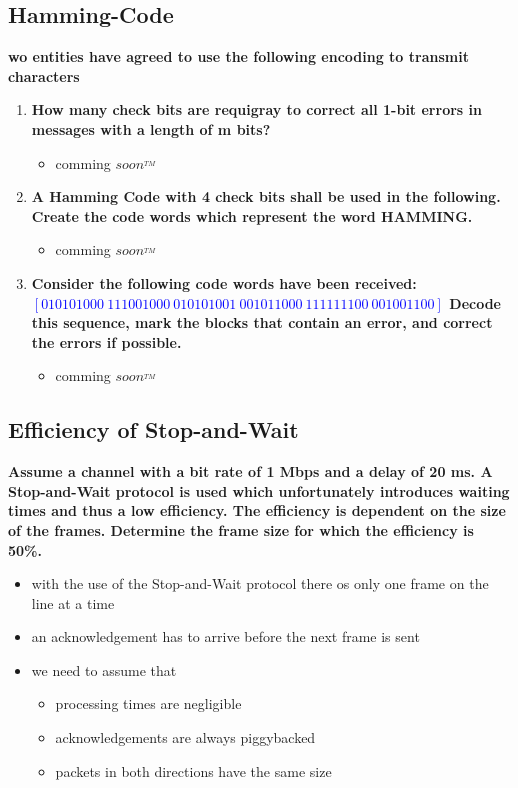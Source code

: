 \documentclass[a4paper,12pt]{article}
\begin{document}
	\subsection{Hamming-Code}
	\textbf{wo entities have agreed to use the following encoding to transmit characters}
	\begin{enumerate}[itemsep=0pt]
		\item \textbf{How many check bits are requigray to correct all 1-bit errors in messages with a length of m bits?}
		\begin{itemize}[itemsep=0pt]
			\item comming $soon^{_{TM}}$
		\end{itemize}
		\item \textbf{A Hamming Code with 4 check bits shall be used in the following.  Create the code words which represent the word HAMMING.}
		\begin{itemize}[itemsep=0pt]
			\item comming $soon^{_{TM}}$
		\end{itemize}
		\item \textbf{Consider the following code words have been received:	\\
		\textcolor{blue}{$[010101000~ 111001000~ 010101001~ 001011000~ 111111100~ 001001100]$} 
		Decode  this  sequence,  mark  the  blocks  that  contain  an  error,  and  correct  the  errors  if possible.}
		\begin{itemize}[itemsep=0pt]
			\item comming $soon^{_{TM}}$
		\end{itemize}
	\end{enumerate}
	
	
	
	\subsection{Efficiency of Stop-and-Wait}
	\textbf{Assume a channel with a bit rate of 1 Mbps and a delay of 20 ms.  A Stop-and-Wait protocol is used which unfortunately introduces waiting times and thus a low efficiency.  The efficiency is dependent on the size of the frames.  Determine the frame size for which the efficiency is 50\%.}\\
	
	\begin{itemize}[itemsep=0pt]
		\item with the use of the Stop-and-Wait protocol there os only one frame on the line at a time
		\item an acknowledgement has to arrive before the next frame is sent
		\item we need to assume that
		\begin{itemize}[itemsep=0pt]
			\item processing times are negligible 
			\item acknowledgements are always piggybacked
			\item packets in both directions have the same size
		\end{itemize}
	\end{itemize}
\end{document}
